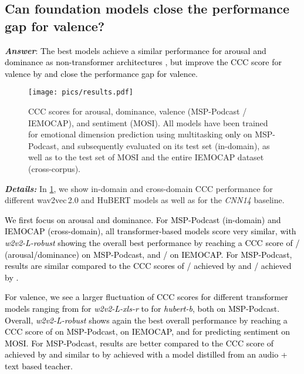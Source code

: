 \documentclass{article}
\newcommand\cnn{\mbox{\emph{CNN14}}}
\newcommand\hbase{\mbox{\emph{hubert-b}}}
\newcommand\wrobust{\mbox{\emph{w2v2-L-robust}}}
\newcommand\wxlsr{\mbox{\emph{w2v2-L-xls-r}}}
\newcommand{\review}[1]{\textcolor{black}{#1}}
\newcommand\msppodcast{\mbox{MSP-Podcast}}
\newcommand\iemocap{\mbox{IEMOCAP}}
\newcommand\mosi{\mbox{MOSI}}
\newcommand{\wtov}{wav2vec\,2.0}
\newcommand{\hubert}{HuBERT}
\begin{document}
\subsection{Can foundation models close the performance gap for valence?}
\label{subsec:valence_gap}

\emph{\textbf{Answer}}:
\review{The best models achieve a similar performance for arousal and dominance 
as non-transformer architectures \citep{li2021contrastive},
but improve the \ac{CCC} score for valence by 
and close the performance gap for valence.}

\begin{figure}[t]
    \centering
    \texttt{[image: pics/results.pdf]}
    \caption{
        \ac{CCC} scores for arousal, dominance, valence ({\msppodcast} / {\iemocap}), and sentiment ({\mosi}).
        All models have been trained for emotional dimension prediction using multitasking \review{only} on {\msppodcast},
        and subsequently evaluated on its test set (in-domain),
        as well as to the test set of {\mosi}
        and the entire {\iemocap} dataset (cross-corpus).
    }
    \label{fig:results}
\end{figure}

\noindent
\emph{\textbf{Details:}}
In \cref{fig:results},
we show in-domain and cross-domain \ac{CCC} performance for different {\wtov} and {\hubert} models 
as well as for the {\cnn} baseline.

\review{
We first focus on arousal and dominance.
For {\msppodcast} (in-domain)
and {\iemocap} (cross-domain),
all transformer-based models score
very similar,
with {\wrobust} showing the overall best performance
by reaching a \ac{CCC} score of / (arousal/dominance)
on {\msppodcast},
and /
on {\iemocap}.
For {\msppodcast}, results are similar
compared to the \ac{CCC} scores of / 
achieved by \citet{li2021contrastive}
and /
achieved by \citet{srinivasan2021representation}.
}

\review{
For valence,
we see a larger fluctuation of \ac{CCC} scores
for different transformer models
ranging from  for {\wxlsr}
to  for {\hbase},
both on {\msppodcast}.
Overall,
{\wrobust} shows again the best overall performance
by reaching a \ac{CCC} score of  on {\msppodcast},
 on {\iemocap},
and  for predicting sentiment on {\mosi}.
For {\msppodcast}, results are better
compared to the \ac{CCC} score of 
achieved by \citet{li2021contrastive}
and similar to 
by \citet{srinivasan2021representation}
achieved with a model distilled from an audio + text based teacher.
}
\end{document}
